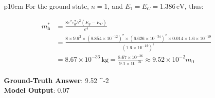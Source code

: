 \begin{table}[!t]
{\begin{tabular}{p{10cm}}
For the ground state, \( n=1 \), and \( E_{1} = E_{C} = 1.386 \, \mathrm{eV} \), thus:

\[
\begin{aligned}
m_{\mathrm{h}}^{*} &= \frac{8 \varepsilon^{2} \varepsilon_{0}^{2} h^{2} (E_{g} - E_{C})}{e^{4}} \\
&= \frac{8 \times 9.6^{2} \times (8.854 \times 10^{-12})^{2} \times (6.626 \times 10^{-34})^{2} \times 0.014 \times 1.6 \times 10^{-19}}{(1.6 \times 10^{-19})^{4}} \\
&= 8.67 \times 10^{-36}\, \mathrm{kg} = \frac{8.67 \times 10^{-36}}{9.1 \times 10^{-31}} \approx 9.52 \times 10^{-2} m_{0}
\end{aligned}
\]
\\
\midrule
\textbf{Ground-Truth Answer}: 9.52 ^{-2} \\

\midrule
\textbf{Model Output}: 0.07\\
\bottomrule
\end{tabular}%
}
\caption{An example of Semiconductor Physics with knowledge deficiency error.}
\label{tabapp:error example 4}
\end{table}
\fi


